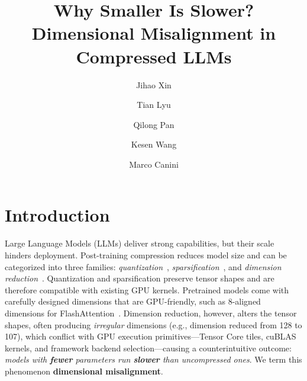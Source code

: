 \documentclass[sigplan,10pt]{acmart}
\title[Why Smaller Is Slower? Dimensional Misalignment in Compressed LLMs]{Why Smaller Is Slower?\\ Dimensional Misalignment in Compressed LLMs}
\author{Jihao Xin}
\affiliation{
  \institution{KAUST}
  \country{}
}
\author{Tian Lyu}
\affiliation{
  \institution{KAUST}
  \country{}
}
\author{Qilong Pan}
\affiliation{
  \institution{KAUST}
  \country{}
}
\author{Kesen Wang}
\affiliation{
  \institution{HUMAIN}
  \country{}
}
\author{Marco Canini}
\affiliation{
  \institution{KAUST}
  \country{}
}
\begin{document}

\maketitle


\section{Introduction}
\label{sec:intro}

Large Language Models (LLMs) deliver strong capabilities, but their scale hinders deployment.
Post-training compression reduces model size and can be categorized into three families: \emph{quantization}~\citep{gptq,awq}, \emph{sparsification}~\citep{sparsegpt,wanda}, and \emph{dimension reduction}~\citep{asvd,palu,pyramidkv}.
Quantization and sparsification preserve tensor shapes and are therefore compatible with existing GPU kernels.
Pretrained models come with carefully designed dimensions that are GPU-friendly, such as 8-aligned dimensions for FlashAttention~\citep{flashattention}.
Dimension reduction, however, alters the tensor shapes, often producing \emph{irregular} dimensions (e.g., dimension reduced from 128 to 107), which conflict with GPU execution primitives---Tensor Core tiles, cuBLAS kernels, and framework backend selection---causing a counterintuitive outcome: \emph{models with \textbf{fewer} parameters run \textbf{slower} than uncompressed ones}.
We term this phenomenon \textbf{dimensional misalignment}.
\end{document}
